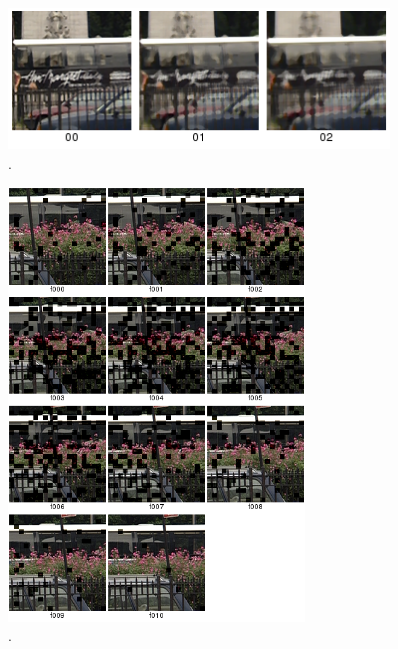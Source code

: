 \begin{figure}[!htb]
	\centering
	\includegraphics[width=0.9\textwidth]{./imgs/blurmedian.png}
	\caption{.}
	\label{fig:blurmedian}
\end{figure}

\begin{figure}[!htb]
	\centering
	\includegraphics[width=0.7\textwidth]{./imgs/busraffle.png}
	\caption{.}
	\label{fig:busraffle}
\end{figure}

